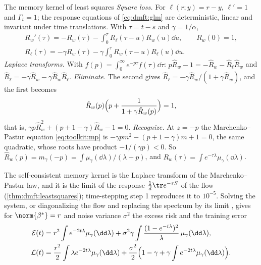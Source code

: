 \begin{refsection}
\begin{computation}{The memory kernel of least squares}\label{comp:dmft:kernel}
\step \emph{Square loss.} For $\ell(r;y)=r-y$, $\ell'=1$ and $\Gamma_t=1$; the response equations of \eqref{eq:dmft:glm} are deterministic, linear and invariant under time translations. With $\tau=t-s$ and $\gamma=1/\alpha$,
\begin{gather*}
R_w'(\tau)=-R_w(\tau)-\int_0^\tau R_\ell(\tau-u)R_w(u)\dd u,\qquad R_w(0)=1,\\
R_\ell(\tau)=-\gamma R_w(\tau)-\gamma\int_0^\tau R_w(\tau-u)R_\ell(u)\dd u.
\end{gather*}
\step \emph{Laplace transforms.} With $\hat f(p)=\int_0^\infty e^{-p\tau}f(\tau)\dd\tau$: $p\hat R_w-1=-\hat R_w-\hat R_\ell\hat R_w$ and $\hat R_\ell=-\gamma\hat R_w-\gamma\hat R_w\hat R_\ell$.
\step \emph{Eliminate.} The second gives $\hat R_\ell=-\gamma\hat R_w/(1+\gamma\hat R_w)$, and the first becomes
\begin{equation}\label{eq:dmft:kernel}
\hat R_w(p)\Bigl(p+\frac1{1+\gamma\hat R_w(p)}\Bigr)=1,
\end{equation}
that is, $\gamma p\hat R_w^2+(p+1-\gamma)\hat R_w-1=0$.
\step \emph{Recognize.} At $z=-p$ the Marchenko--Pastur equation \eqref{eq:toolkit:mp} is $-\gamma pm^2-(p+1-\gamma)m+1=0$, the same quadratic, whose roots have product $-1/(\gamma p)<0$. So $\hat R_w(p)=m_\gamma(-p)=\int\mu_\gamma(\dd\lambda)/(\lambda+p)$, and $R_w(\tau)=\int e^{-\tau\lambda}\mu_\gamma(\dd\lambda)$.
\end{computation}

The self-consistent memory kernel is the Laplace transform of the Marchenko--Pastur law, and it is the limit of the response $\frac1d\tr e^{-\tau S}$ of the flow (\cref{thm:dmft:leastsquares}); time-stepping step 1 reproduces it to $10^{-5}$. Solving the system, or diagonalizing the flow and replacing the spectrum by its limit \parencite{AdvaniSaxeSompolinsky2020}, gives for $\norm{\beta^*}=r$ and noise variance $\sigma^2$ the excess risk and the training error
\begin{equation}\label{eq:dmft:risk}
\begin{aligned}
\dmftE(t)&=r^2\int e^{-2t\lambda}\mu_\gamma(\dd\lambda)+\sigma^2\gamma\int\frac{(1-e^{-t\lambda})^2}\lambda\,\mu_\gamma(\dd\lambda),\\
\dmftL(t)&=\frac{r^2}2\int\lambda e^{-2t\lambda}\mu_\gamma(\dd\lambda)+\frac{\sigma^2}2\Bigl(1-\gamma+\gamma\int e^{-2t\lambda}\mu_\gamma(\dd\lambda)\Bigr).
\end{aligned}
\end{equation}


\end{refsection}
